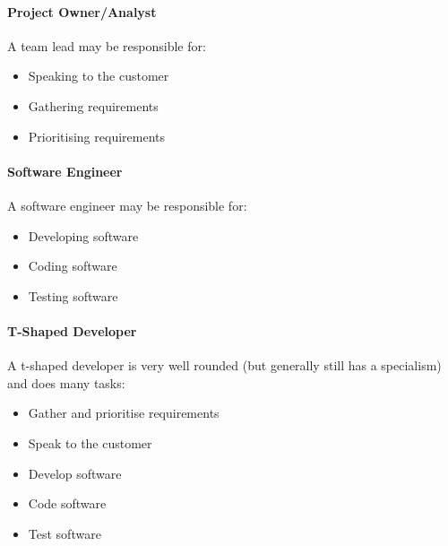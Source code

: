 \paragraph{Project Owner/Analyst}\label{par:project_owner_analyst}

A team lead may be responsible for:

\begin{itemize}
	\item Speaking to the customer
	\item Gathering requirements
	\item Prioritising requirements
\end{itemize}

\paragraph{Software Engineer}\label{par:software_engineer}

A software engineer may be responsible for:

\begin{itemize}
	\item Developing software
	\item Coding software
	\item Testing software
\end{itemize}

\paragraph{T-Shaped Developer}\label{par:t_shaped_developer}

A t-shaped developer is very well rounded (but generally still has a specialism) and does many tasks:

\begin{itemize}
	\item Gather and prioritise requirements
	\item Speak to the customer
	\item Develop software
	\item Code software
	\item Test software
\end{itemize}
